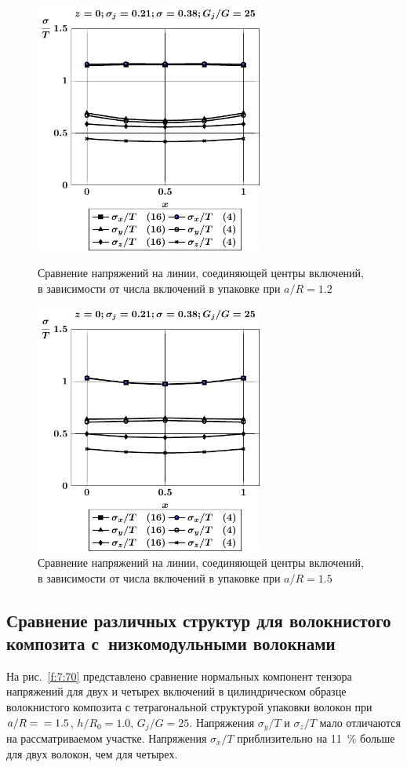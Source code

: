 \begin{figure}[h!]
\centering\footnotesize
\parbox[b]{7.5cm}{\centering\includegraphics[width=7.5cm]{inc16-4-a12-h10-r10-g25-z0.pdf}
\caption{Сравнение напряжений на линии, соединяющей центры включений, в зависимости от числа включений в упаковке при $a/R=1.2$ 
\label{fig:10}}}\hfil\hfil
\parbox[b]{7.5cm}{\centering\includegraphics[width=7.5cm]{inc16-4-a15-h10-r10-g25-z0.pdf}
\caption{Сравнение напряжений на линии, соединяющей центры включений, в зависимости от числа включений в упаковке при $a/R=1.5$
\label{fig:11}
}}
\end{figure}

\subsection{Сравнение различных структур для волокнистого композита с~низкомодульными волокнами}

На рис.~\ref{f:7:70} представлено сравнение нормальных компонент тензора напряжений для двух и четырех включений в цилиндрическом образце волокнистого композита с тетрагональной структурой упаковки волокон при $a/R=\\=1.5$, $h/R_0=1.0$, $G_j/G=25$. Напряжения $\sigma_y/T$ и $\sigma_z/T$ мало отличаются на рассматриваемом участке. Напряжения $\sigma_x/T$ приблизительно на 11~\% больше для двух волокон, чем для четырех.\sloppy

